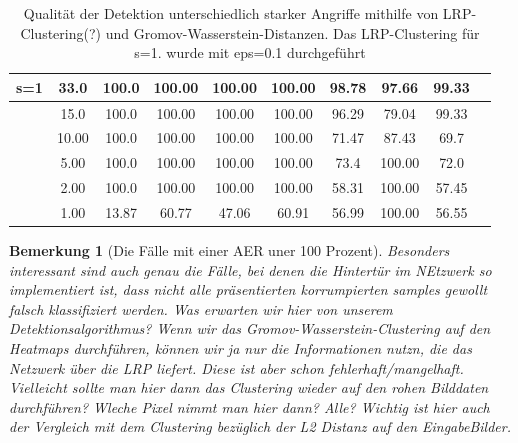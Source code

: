 \documentclass[11pt,a4paper]{article}
\newtheorem{remark}[theorem]{Bemerkung}
\numberwithin{equation}{section}
\begin{document}
\begin{table}[ht]
\begin{center}
{\begin{tabular}{|l|c|c|ccc|ccc|c|}
				s=1 			& 33.0 			& 100.0 	& 100.00&100.00		& 100.00& 98.78	& 97.66	& 99.33	& \\ \hline
								& 15.0			& 100.0		& 100.00&100.00		& 100.00& 96.29	& 79.04	& 99.33	&\\
								& 10.00			& 100.0		& 100.00& 100.00	& 100.00& 71.47	& 87.43 & 69.7& \\
								& 5.00			& 100.0		& 100.00& 100.00	& 100.00& 73.4	& 100.00& 72.0&\\
								& 2.00			& 100.0		& 100.00& 100.00	& 100.00& 58.31 & 100.00& 57.45\\
								& 1.00			& 13.87		& 60.77 & 47.06		& 60.91	& 56.99	& 100.00& 56.55 
			\end{tabular}}
			\caption[Vergleich von Angriffen und Verteidigungen für SPA]{Qualität der Detektion unterschiedlich starker Angriffe mithilfe von LRP-Clustering(?) und Gromov-Wasserstein-Distanzen. Das LRP-Clustering für s=1. wurde mit eps=0.1 durchgeführt}
			\label{tab:SPA_def_inv3_gwclustering}	
		\end{center}
	\end{table}
	\begin{remark}[Die Fälle mit einer AER uner 100 Prozent]
		Besonders interessant sind auch genau die Fälle, bei denen die Hintertür im NEtzwerk so implementiert ist, dass nicht alle präsentierten korrumpierten samples gewollt falsch klassifiziert werden. Was erwarten wir hier von unserem Detektionsalgorithmus? Wenn wir das Gromov-Wasserstein-Clustering auf den Heatmaps durchführen, können wir ja nur die Informationen nutzn, die das Netzwerk über die LRP liefert. Diese ist aber schon fehlerhaft/mangelhaft. Vielleicht sollte man hier dann das Clustering wieder auf den rohen Bilddaten durchführen?  Wleche Pixel nimmt man hier dann? Alle? Wichtig ist hier auch der Vergleich mit dem Clustering bezüglich der L2 Distanz auf den EingabeBilder.
	\end{remark}
	
\end{document}
